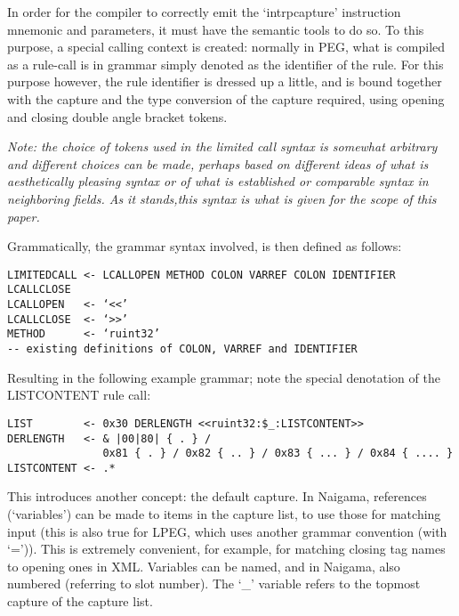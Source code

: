 In order for the compiler to correctly emit the ‘intrpcapture’ 
instruction mnemonic and parameters, it must have the semantic tools to do 
so. To this purpose, a special calling context is created: normally in 
PEG, what is compiled as a rule-call is in grammar simply denoted as the 
identifier of the rule. For this purpose however, the rule identifier is 
dressed up a little, and is bound together with the capture and the type 
conversion of the capture required, using opening and closing double angle 
bracket tokens.

\textit{
Note: the choice of tokens used in the limited call syntax
is somewhat arbitrary and different
choices can be made, perhaps based on different ideas of what is
aesthetically pleasing syntax or of what is established or comparable
syntax in neighboring fields.
As it stands,this syntax is what is given for the scope of this paper.
}

Grammatically, the grammar syntax involved, is then defined as follows:

\begin{changemargin}{-60mm}{0mm}
\begin{myquote}
\begin{verbatim}
LIMITEDCALL <- LCALLOPEN METHOD COLON VARREF COLON IDENTIFIER LCALLCLOSE
LCALLOPEN   <- ‘<<’
LCALLCLOSE  <- ‘>>’
METHOD      <- ‘ruint32’
-- existing definitions of COLON, VARREF and IDENTIFIER
\end{verbatim}
\end{myquote}
\end{changemargin}

Resulting in the following example grammar; note the special denotation of 
the LISTCONTENT rule call:

\begin{changemargin}{-60mm}{0mm}
\begin{myquote}
\begin{verbatim}
LIST        <- 0x30 DERLENGTH <<ruint32:$_:LISTCONTENT>>
DERLENGTH   <- & |00|80| { . } /
               0x81 { . } / 0x82 { .. } / 0x83 { ... } / 0x84 { .... }
LISTCONTENT <- .*
\end{verbatim}
\end{myquote}
\end{changemargin}

This introduces another concept: the default capture. In Naigama, 
references (‘variables’) can be made to items in the capture list, to 
use those for matching input (this is also true for LPEG, which uses 
another grammar convention (with ‘=’)). This is extremely convenient, 
for example, for matching closing tag names to opening ones in XML. 
Variables can be named, and in Naigama, also numbered (referring to slot 
number). The ‘\_’ variable refers to the topmost capture of the capture 
list.


